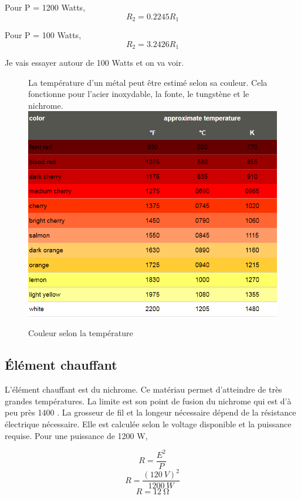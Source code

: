 \documentclass{article}
\begin{document}
Pour P = 1200 Watts,
\[R_2 = 0.2245R_1\]

Pour P = 100 Watts,
\[R_2 = 3.2426R_1\]

Je vais essayer autour de 100 Watts et on va voir.

\begin{figure}[ht]
    La température d'un métal peut être estimé selon sa couleur. Cela fonctionne pour l'acier inoxydable, la fonte, le tungstène et le nichrome. \\
    
    \centering
    \includegraphics[width=\textwidth]{metalColorTempChart.png}
    \caption{Couleur selon la température}
    \label{fig:couleurTemp}
\end{figure}

\subsection{Élément chauffant}

L'élément chauffant est du nichrome. Ce matériau permet d'atteindre de très grandes températures. La limite est son point de fusion du nichrome qui est d'à peu près 1400 \celsius. La grosseur de fil et la longeur nécessaire dépend de la résistance électrique nécessaire. Elle est calculée selon le voltage disponible et la puissance requise. Pour une puissance de 1200 W,

\begin{equation}
    R = \frac{E^2}{P}
\end{equation}
\[R = \frac{(\SI{120}{V})^2}{\SI{1200}{W}}\]
\[\boxed{R = \SI{12}{\ohm}}\]
\end{document}
